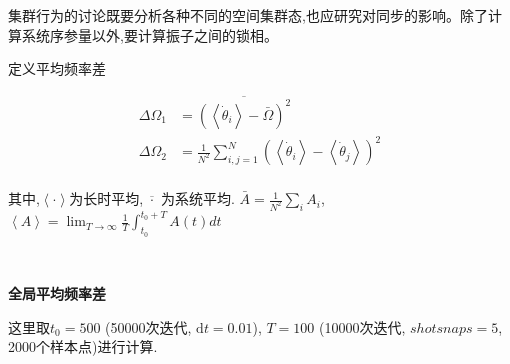\documentclass{article}
\begin{document}
集群行为的讨论既要分析各种不同的空间集群态,也应研究对同步的影响。除了计算系统序参量以外,要计算振子之间的锁相。

定义平均频率差

$$
\begin{aligned}
	\Delta \Omega _1&=\overline{\left( \left< \dot{\theta}_i \right> -\bar{\Omega} \right) ^2}\\
	\Delta \Omega _2&=\frac{1}{N^2}\sum_{i,j=1}^N{\left( \left< \dot{\theta}_i \right> -\left< \dot{\theta}_j \right> \right) ^2}\\
\end{aligned}
$$

其中,$\left< \cdot \right>$为长时平均,$\overline{\,\,\cdot \,\,}$为系统平均. $\bar{A}=\frac{1}{N^2}\sum\nolimits_i^{}{A_i}$, $\left< A \right> =\lim_{T\rightarrow \infty} \frac{1}{T}\int_{t_0}^{t_0+T}{A\left( t \right) dt}$

$ $

\noindent\textbf{全局平均频率差}

这里取$t_0=500$ (50000次迭代, $\mathrm{d}t=0.01$), $T=100$ (10000次迭代, $shotsnaps=5$, 2000个样本点)进行计算.
\end{document}
